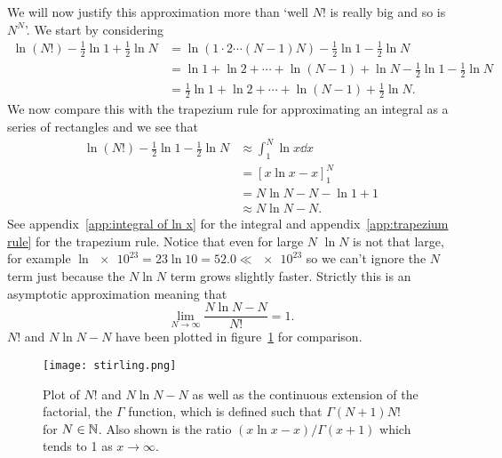 \documentclass[a4paper]{article}
\begin{document}
    We will now justify this approximation more than `well \(N!\) is really big and so is \(N^N\)'.
    We start by considering
    \begin{align*}
        \ln(N!) - \frac{1}{2}\ln 1 + \frac{1}{2}\ln N &= \ln(1\cdot 2\dotsm(N - 1)N) - \frac{1}{2}\ln 1 - \frac{1}{2}\ln N\\
        &= \ln 1 + \ln 2 + \dotsb + \ln(N - 1) + \ln N - \frac{1}{2}\ln 1 - \frac{1}{2}\ln N\\
        &= \frac{1}{2}\ln 1 + \ln 2 + \dotsb + \ln(N - 1) + \frac{1}{2}\ln N.
    \end{align*}
    We now compare this with the trapezium rule for approximating an integral as a series of rectangles and we see that
    \begin{align*}
        \ln(N!) - \frac{1}{2}\ln 1 - \frac{1}{2}\ln N &\approx \int_{1}^{N}\ln x \dd{x}\\
        &= [x\ln x - x]_1^N\\
        &= N\ln N - N - \ln 1 + 1\\
        &\approx N\ln N - N.
    \end{align*}
    See appendix~\ref{app:integral of ln x} for the integral and appendix~\ref{app:trapezium rule} for the trapezium rule.
    Notice that even for large \(N\) \(\ln N\) is not that large, for example \(\ln \num{e23} = 23\ln 10 = 52.0 \ll \num{e23}\) so we can't ignore the \(N\) term just because the \(N\ln N\) term grows slightly faster.
    Strictly this is an asymptotic approximation meaning that
    \[\lim_{N\to\infty} \frac{N\ln N - N}{N!} = 1.\]
    \(N!\) and \(N\ln N - N\) have been plotted in figure~\ref{fig:stirling's approximation} for comparison.
    \begin{figure}[ht]
        \centering
        \texttt{[image: stirling.png]}
        \caption{Plot of \(N!\) and \(N\ln N - N\) as well as the continuous extension of the factorial, the \(\Gamma\) function, which is defined such that \(\Gamma(N + 1) N!\) for \(N\in\mathbb{N}\). Also shown is the ratio \((x\ln x - x) / \Gamma(x + 1)\) which tends to 1 as \(x \to \infty\).}
        \label{fig:stirling's approximation}
    \end{figure}
\end{document}
